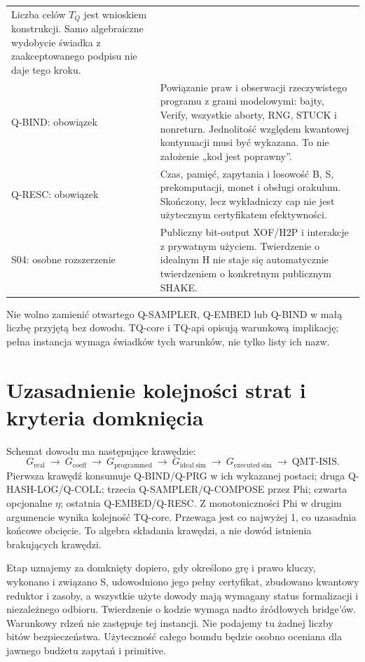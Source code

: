 \documentclass[11pt,a4paper]{article}
\begin{document}
\begin{longtable}{@{}p{.22\linewidth}p{.71\linewidth}@{}}
Liczba celów $T_Q$ jest wnioskiem konstrukcji. Samo algebraiczne
wydobycie świadka z zaakceptowanego podpisu nie daje tego kroku.\\
Q-BIND: obowiązek & Powiązanie praw i obserwacji rzeczywistego programu
z grami modelowymi: bajty, Verify, wszystkie aborty, RNG, STUCK i nonreturn.
Jednolitość względem kwantowej kontynuacji musi być wykazana.
To nie założenie „kod jest poprawny”.\\
Q-RESC: obowiązek & Czas, pamięć, zapytania i losowość B, S, prekomputacji,
monet i obsługi orakulum. Skończony, lecz wykładniczy cap nie jest
użytecznym certyfikatem efektywności.\\
S04: osobne rozszerzenie & Publiczny bit-output XOF/H2P i interakcje
z prywatnym użyciem. Twierdzenie o idealnym H nie staje się automatycznie
twierdzeniem o konkretnym publicznym SHAKE.\\
\bottomrule\end{longtable}\normalsize

Nie wolno zamienić otwartego Q-SAMPLER, Q-EMBED lub Q-BIND w małą
liczbę przyjętą bez dowodu. TQ-core i TQ-api opisują warunkową implikację;
pełna instancja wymaga świadków tych warunków, nie tylko listy ich nazw.

\section{Uzasadnienie kolejności strat i kryteria domknięcia}
Schemat dowodu ma następujące krawędzie:
\[
 G_{\mathrm{real}}\ \longrightarrow\ G_{\mathrm{coeff}}
 \ \longrightarrow\ G_{\mathrm{programmed}}
 \ \longrightarrow\ G_{\mathrm{ideal\ sim}}
 \ \longrightarrow\ G_{\mathrm{executed\ sim}}
 \ \longrightarrow\ \mathrm{QMT\text{-}ISIS}.
\]
Pierwsza krawędź konsumuje Q-BIND/Q-PRG w ich wykazanej postaci;
druga Q-HASH-LOG/Q-COLL; trzecia Q-SAMPLER/Q-COMPOSE przez Phi;
czwarta opcjonalne $\eta$; ostatnia Q-EMBED/Q-RESC.
Z monotoniczności Phi w drugim argumencie wynika kolejność TQ-core.
Przewaga jest co najwyżej 1, co uzasadnia końcowe obcięcie.
To algebra składania krawędzi, a nie dowód istnienia brakujących krawędzi.

Etap uznajemy za domknięty dopiero, gdy określono grę i prawo kluczy,
wykonano i związano S, udowodniono jego pełny certyfikat, zbudowano
kwantowy reduktor i zasoby, a wszystkie użyte dowody mają wymagany
status formalizacji i niezależnego odbioru. Twierdzenie o kodzie wymaga
nadto źródłowych bridge'ów. Warunkowy rdzeń nie zastępuje tej instancji.
Nie podajemy tu żadnej liczby bitów bezpieczeństwa. Użyteczność całego
boundu będzie osobno oceniana dla jawnego budżetu zapytań i primitive.
\end{document}
